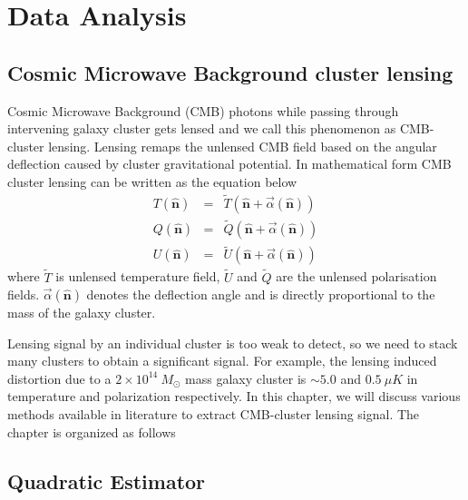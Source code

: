 \chapter{Data Analysis}
\label{ch:analysis}

\section*{Cosmic Microwave Background cluster lensing}

Cosmic Microwave Background (CMB) photons while passing through intervening galaxy cluster gets lensed and we call this phenomenon as CMB-cluster lensing.
 Lensing remaps the unlensed CMB field based on the angular deflection caused by cluster gravitational potential.
 In mathematical form CMB cluster lensing can be written as the equation below
 \begin{eqnarray}
T(\hat{\textbf{n}})& = & \widetilde{T} (\hat{\textbf{n}} + \vec{\alpha}(\hat{\textbf{n}}))\\
Q(\hat{\textbf{n}}) & = & \widetilde{Q} (\hat{\textbf{n}} + \vec{\alpha}(\hat{\textbf{n}}))\\
U(\hat{\textbf{n}}) & = & \widetilde{U} (\hat{\textbf{n}} + \vec{\alpha}(\hat{\textbf{n}}))
\end{eqnarray}
where $ \widetilde{T}$ is unlensed temperature field, $\widetilde{U}$ and $\widetilde{Q}$ are the unlensed polarisation fields.
$\vec{\alpha}(\hat{\textbf{n}})$ denotes the deflection angle and is directly proportional to the mass of the galaxy cluster.

Lensing signal by an individual cluster is too weak to detect, so we need to stack many clusters to obtain a significant signal.
 For example, the lensing induced distortion due to a $2 \times 10^{14} \ M_{\odot}$ mass galaxy cluster  is $\sim 5.0$ and $0.5 \ \mu K$ in temperature and polarization respectively.
In this chapter, we will discuss various methods available in literature to extract CMB-cluster lensing signal. 
The chapter is organized as follows 

\section{Quadratic Estimator}

